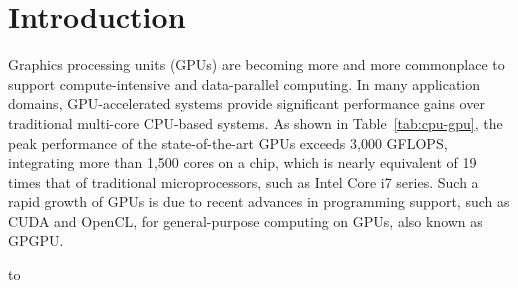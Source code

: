 
\section{Introduction}\label{sec:intro}

Graphics processing units (GPUs) are becoming more and more commonplace
to support compute-intensive and data-parallel computing.
In many application domains, GPU-accelerated systems provide significant
performance gains over traditional multi-core CPU-based systems.
As shown in Table~\ref{tab:cpu-gpu}, the peak performance of the
state-of-the-art GPUs exceeds 3,000 GFLOPS, integrating more than 1,500
cores on a chip, which is nearly equivalent of 19 times that of
traditional microprocessors, such as Intel Core i7 series.
Such a rapid growth of GPUs is due to recent advances in programming
support, such as CUDA\cite{CUDA} and OpenCL\cite{OPENCL},  for
general-purpose computing on GPUs, also known as GPGPU.

\begin{table*}[tb]
 \caption{Comparison of the Intel CPU Architectures and the NVIDIA GPU
 Architectures}
 \label{tab:cpu-gpu}
 \begin{center}
  \hbox to
 \end{center}
\end{table*}

